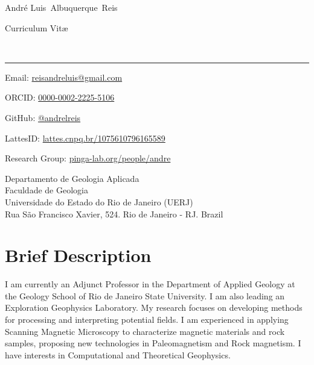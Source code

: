 \documentclass[10pt,a4paper]{article}
\makeatletter
\newcommand{\UERJ}{Universidade do Estado do Rio de Janeiro (UERJ)}
\newcommand{\DGAP}{Departamento de Geologia Aplicada}
\newcommand{\FGEL}{Faculdade de Geologia}
\newcommand{\Title}{Curriculum Vit\ae}
\newcommand{\Firstname}{Andr\'{e} Luis}
\newcommand{\Middlename}{Albuquerque}
\newcommand{\Lastname}{Reis}
\newcommand{\Fullname}{\Firstname\ \Middlename\ \Lastname}
\newcommand{\PersonalEmail}{reisandreluis@gmail.com}
\newcommand{\ResearchGroup}{pinga-lab.org/people/andre}
\newcommand{\GitHubProfile}{@andrelreis}
\newcommand{\ORCID}{0000-0002-2225-5106}
\newcommand{\LattesID}{lattes.cnpq.br/1075610796165589}
\makeatother
\begin{document}
\begin{minipage}[t]{0.5\textwidth}
  {\fontsize{20pt}{0}\selectfont\Fullname}
\end{minipage}
\begin{minipage}[t]{0.5\textwidth}
  \begin{flushright}
    \Title{}
  \end{flushright}
\end{minipage}
\\[-0.1cm]
\textcolor{black}{\rule{\textwidth}{2pt}}
\begin{minipage}[t]{0.5\textwidth}
   \footnotesize \parbox{0.04\textwidth}{\faEnvelope} Email: \href{mailto:\PersonalEmail}{\PersonalEmail}
  \\
  \footnotesize \parbox{0.04\textwidth}{\aiOrcid} ORCID: \href{https://orcid.org/\ORCID}{\ORCID}
  \\
  \footnotesize \parbox{0.04\textwidth}{\faGithub} GitHub: \href{https://github.com/andrelreis}{\GitHubProfile}
  \\
  \footnotesize \parbox{0.04\textwidth}{\aiLattes} LattesID: \href{http://lattes.cnpq.br/1075610796165589}{\LattesID}
  \\
  \footnotesize \parbox{0.04\textwidth}{\faUsers} Research Group: \href{\ResearchGroup}{\ResearchGroup}
\end{minipage}
\begin{minipage}[t]{0.5\textwidth}
  \begin{flushright}
  \DGAP
  \\
  \FGEL
  \\
  \UERJ
  \\
   Rua São Francisco Xavier, 524. Rio de Janeiro - RJ. Brazil
  \end{flushright}
\end{minipage}

\vspace{0.3cm}

\section{Brief Description}
\vspace{0.3cm}
I am currently an Adjunct Professor in the Department of Applied Geology at the Geology School of Rio de Janeiro State University. I am also leading an Exploration Geophysics Laboratory. My research focuses on developing methods for processing and interpreting potential fields. I am experienced in applying Scanning Magnetic Microscopy to characterize magnetic materials and rock samples, proposing new technologies in Paleomagnetism and Rock magnetism. I have interests in Computational and Theoretical Geophysics.
\end{document}
